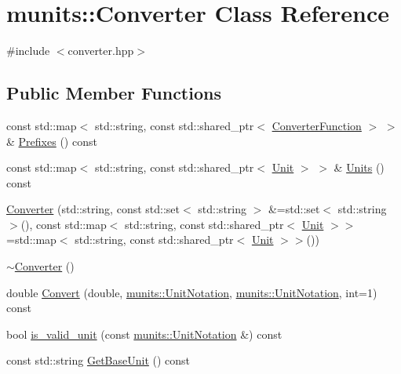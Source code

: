 \hypertarget{classmunits_1_1_converter}{}\section{munits\+:\+:Converter Class Reference}
\label{classmunits_1_1_converter}


{\ttfamily \#include $<$converter.\+hpp$>$}

\subsection*{Public Member Functions}
\begin{DoxyCompactItemize}
\item 
const std\+::map$<$ std\+::string, const std\+::shared\+\_\+ptr$<$ \hyperlink{classmunits_1_1_converter_function}{Converter\+Function} $>$ $>$ \& \hyperlink{classmunits_1_1_converter_a48a8ab27724c3aa86e9f36bc8699ae22}{Prefixes} () const
\item 
const std\+::map$<$ std\+::string, const std\+::shared\+\_\+ptr$<$ \hyperlink{classmunits_1_1_unit}{Unit} $>$ $>$ \& \hyperlink{classmunits_1_1_converter_aaff2382aa50e3387784e2aaba90ba4ae}{Units} () const
\item 
\hyperlink{classmunits_1_1_converter_a047effa7046385a48cc7fa959a031823}{Converter} (std\+::string, const std\+::set$<$ std\+::string $>$ \&=std\+::set$<$ std\+::string $>$(), const std\+::map$<$ std\+::string, const std\+::shared\+\_\+ptr$<$ \hyperlink{classmunits_1_1_unit}{Unit} $>$$>$=std\+::map$<$ std\+::string, const std\+::shared\+\_\+ptr$<$ \hyperlink{classmunits_1_1_unit}{Unit} $>$$>$())
\item 
\hyperlink{classmunits_1_1_converter_acd1f8a562a9172c1593915798a9be4a8}{$\sim$\+Converter} ()
\item 
double \hyperlink{classmunits_1_1_converter_a58795a22d588dfebfe9ca62e47ea3cb9}{Convert} (double, \hyperlink{classmunits_1_1_unit_notation}{munits\+::\+Unit\+Notation}, \hyperlink{classmunits_1_1_unit_notation}{munits\+::\+Unit\+Notation}, int=1) const
\item 
bool \hyperlink{classmunits_1_1_converter_aa102ca105463948f68ba7a5b399bac42}{is\+\_\+valid\+\_\+unit} (const \hyperlink{classmunits_1_1_unit_notation}{munits\+::\+Unit\+Notation} \&) const
\item 
const std\+::string \hyperlink{classmunits_1_1_converter_a3c707dedadbd4bf40f1836f463357d55}{Get\+Base\+Unit} () const
\end{DoxyCompactItemize}


